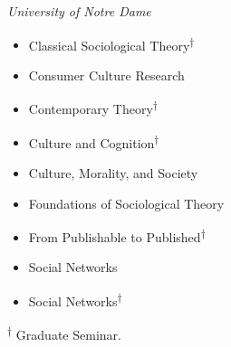 \documentclass[
]{article}
\providecommand{\tightlist}{%
  \setlength{\itemsep}{0pt}\setlength{\parskip}{0pt}}
\begin{document}
\emph{University of Notre Dame}

\begin{itemize}
\tightlist
\item
  Classical Sociological Theory\textsuperscript{†}\\
\item
  Consumer Culture Research\\
\item
  Contemporary Theory\textsuperscript{†}
\item
  Culture and Cognition\textsuperscript{†}
\item
  Culture, Morality, and Society\\
\item
  Foundations of Sociological Theory\\
\item
  From Publishable to Published\textsuperscript{†}\\
\item
  Social Networks\\
\item
  Social Networks\textsuperscript{†}
\end{itemize}

\textsuperscript{†} Graduate Seminar.
\end{document}
